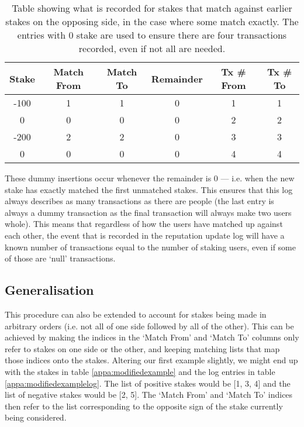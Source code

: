\begin{table}[ht]
\centering
\caption{Table showing what is recorded for stakes that match against earlier stakes on the opposing side, in the case where some match exactly. The entries with 0 stake are used to ensure there are four transactions recorded, even if not all are needed.}
\label{tab:matchFromTo}
\begin{tabular}{|c|c|c|c|c|c|}
\hline
Stake & Match From & Match To & Remainder & Tx \# From & Tx \# To \\ \hline
-100  & 1          & 1        & 0   & 1 & 1     \\ \hline
 0 & 0          & 0        & 0      & 2 & 2   \\ \hline
-200 & 2          & 2        & 0    & 3 & 3    \\ \hline
 0 & 0          & 0        & 0      & 4 & 4   \\ \hline
\end{tabular}
\end{table}

These dummy insertions occur whenever the remainder is 0 --- i.e. when the new stake has exactly matched the first unmatched stakes. This ensures that this log always describes as many transactions as there are people (the last entry is always a dummy transaction as the final transaction will always make two users whole). This means that regardless of how the users have matched up against each other, the event that is recorded in the reputation update log will have a known number of transactions equal to the number of staking users, even if some of those are `null' transactions.

\subsection{Generalisation}

This procedure can also be extended to account for stakes being made in arbitrary orders (i.e. not all of one side followed by all of the other). This can be achieved by making the indices in the `Match From' and `Match To' columns only refer to stakes on one side or the other, and keeping matching lists that map those indices onto the stakes. Altering our first example slightly, we might end up with the stakes in table \ref{appa:modifiedexample} and the log entries in table \ref{appa:modifiedexamplelog}. The list of positive stakes would be [1, 3, 4] and the list of negative stakes would be [2, 5]. The `Match From' and `Match To' indices then refer to the list corresponding to the opposite sign of the stake currently being considered.

